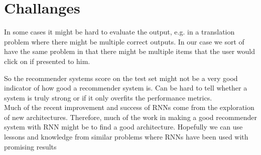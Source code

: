 \chapter{Challanges}


In some cases it might be hard to evaluate the output, e.g. in a translation problem where there might be multiple correct outputs. In our case we sort of have the same problem in that there might be multiple items that the user would click on if presented to him.

So the recommender systems score on the test set might not be a very good indicator of how good a recommender system is. Can be hard to tell whether a system is truly strong or if it only overfits the performance metrics.\\

Much of the recent improvement and success of RNNs come from the exploration of new architectures. Therefore, much of the work in making a good recommender system with RNN might be to find a good architecture. Hopefully we can use lessons and knowledge from similar problems where RNNs have been used with promising results